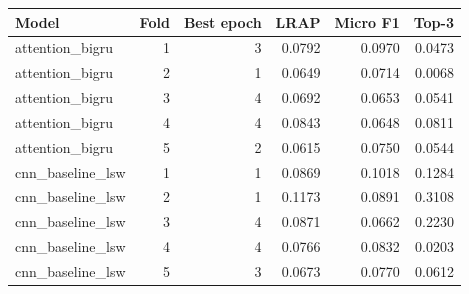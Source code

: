 \begin{tabular}{lrrrrr}
\toprule
Model & Fold & Best epoch & LRAP & Micro F1 & Top-3 \\
\midrule
attention\_bigru & 1 & 3 & 0.0792 & 0.0970 & 0.0473 \\
attention\_bigru & 2 & 1 & 0.0649 & 0.0714 & 0.0068 \\
attention\_bigru & 3 & 4 & 0.0692 & 0.0653 & 0.0541 \\
attention\_bigru & 4 & 4 & 0.0843 & 0.0648 & 0.0811 \\
attention\_bigru & 5 & 2 & 0.0615 & 0.0750 & 0.0544 \\
cnn\_baseline\_lsw & 1 & 1 & 0.0869 & 0.1018 & 0.1284 \\
cnn\_baseline\_lsw & 2 & 1 & 0.1173 & 0.0891 & 0.3108 \\
cnn\_baseline\_lsw & 3 & 4 & 0.0871 & 0.0662 & 0.2230 \\
cnn\_baseline\_lsw & 4 & 4 & 0.0766 & 0.0832 & 0.0203 \\
cnn\_baseline\_lsw & 5 & 3 & 0.0673 & 0.0770 & 0.0612 \\
\bottomrule
\end{tabular}